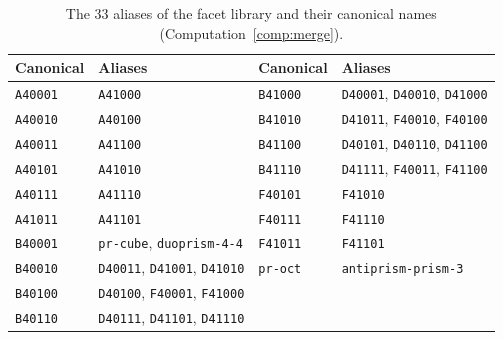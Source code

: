 \documentclass[11pt]{article}
\theoremstyle{definition}
\theoremstyle{remark}
\begin{document}
\begin{appendices}
\begin{table}[ht]
\centering\small
\caption{The 33 aliases of the facet library and their canonical names
(Computation~\ref{comp:merge}).}\label{tab:aliases}
\begin{tabular}{@{}ll@{\qquad}ll@{}}
\toprule
Canonical & Aliases & Canonical & Aliases\\
\midrule
\texttt{A40001} & \texttt{A41000} & \texttt{B41000} & \texttt{D40001}, \texttt{D40010}, \texttt{D41000}\\
\texttt{A40010} & \texttt{A40100} & \texttt{B41010} & \texttt{D41011}, \texttt{F40010}, \texttt{F40100}\\
\texttt{A40011} & \texttt{A41100} & \texttt{B41100} & \texttt{D40101}, \texttt{D40110}, \texttt{D41100}\\
\texttt{A40101} & \texttt{A41010} & \texttt{B41110} & \texttt{D41111}, \texttt{F40011}, \texttt{F41100}\\
\texttt{A40111} & \texttt{A41110} & \texttt{F40101} & \texttt{F41010}\\
\texttt{A41011} & \texttt{A41101} & \texttt{F40111} & \texttt{F41110}\\
\texttt{B40001} & \texttt{pr-cube}, \texttt{duoprism-4-4} & \texttt{F41011} & \texttt{F41101}\\
\texttt{B40010} & \texttt{D40011}, \texttt{D41001}, \texttt{D41010} & \texttt{pr-oct} & \texttt{antiprism-prism-3}\\
\texttt{B40100} & \texttt{D40100}, \texttt{F40001}, \texttt{F41000} & & \\
\texttt{B40110} & \texttt{D40111}, \texttt{D41101}, \texttt{D41110} & & \\
\bottomrule
\end{tabular}
\end{table}

\end{appendices}
\end{document}
